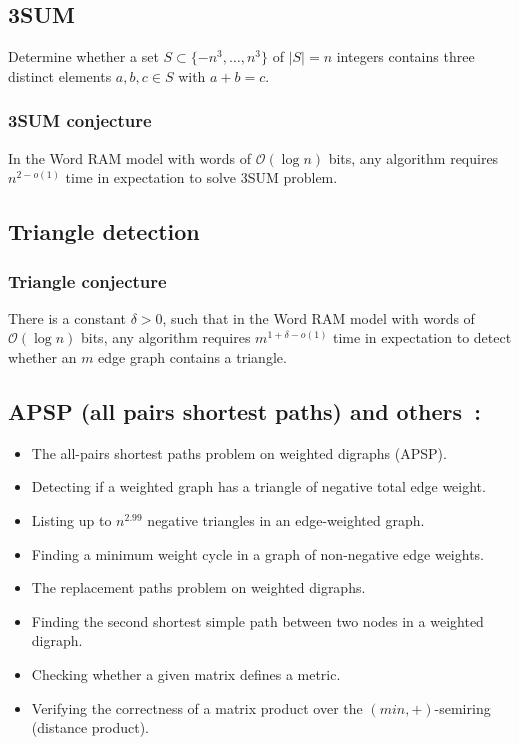 \documentclass{amsart}
\begin{document}
	\subsection{3SUM}
	Determine whether a set $S \subset \{-n^3, \ldots, n^3\}$ of $|S|= n$ integers contains three distinct elements $a, b, c \in S$ with $a + b = c$.
	
	\subsubsection{3SUM conjecture}
	In the Word RAM model with words of $\mathcal{O}(\log n)$ bits, any algorithm requires $n^{2 - o(1)}$ time in expectation to solve 3SUM problem.
	
	\subsection{Triangle detection}
	
	\subsubsection{Triangle conjecture}
	There is a constant $\delta > 0$, such that in the Word RAM model with words of $\mathcal{O}(\log n)$ bits, any algorithm requires $m^{1 + \delta - o(1)}$ time in expectation to detect whether an $m$ edge graph contains a triangle.
	
	\subsection{APSP (all pairs shortest paths) and others~\cite{10.1145/3186893}:}
	\label{apsp_equiv}
	
	\begin{itemize}
		\item The all-pairs shortest paths problem on weighted digraphs (APSP).
		\item Detecting if a weighted graph has a triangle of negative total edge weight.
		\item Listing up to $n^{2.99}$ negative triangles in an edge-weighted graph.
		\item Finding a minimum weight cycle in a graph of non-negative edge weights.
		\item The replacement paths problem on weighted digraphs.
		\item Finding the second shortest simple path between two nodes in a weighted digraph.
		\item Checking whether a given matrix defines a metric.
		\item Verifying the correctness of a matrix product over the $(min, +)$-semiring (distance product).
	\end{itemize}
	
\end{document}

